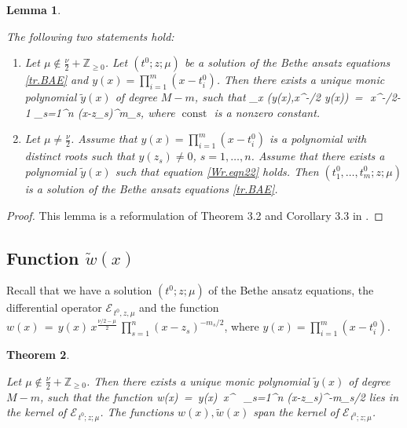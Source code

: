 \documentclass[12pt]{amsart}
\newtheorem{thm}{Theorem}[section]
\newtheorem{lem}[thm]{Lemma}
\numberwithin{equation}{section}
\theoremstyle{definition}
\let\mc\mathcal
\let\geq\geqslant
\let\on\operatorname
\def\Z{{\mathbb Z}}
\def\const{\on{const}}
\def\Wr{\on{Wr}}
\begin{document}
\begin{lem} 
\label{lem WBA}

The following two statements hold:

\begin{enumerate}

\item[(i)]

Let $\mu\notin \frac\nu2+\Z_{\geq 0}$. Let   $(t^0;z;\mu)$ be a solution
 of the Bethe ansatz equations \eqref{tr.BAE} and
$y(x)=  \prod_{i=1}^m(x-t^0_i)$.  Then there exists a unique 
monic polynomial $\tilde y(x)$ of degree $M-m$, such that 
\bean
\label{Wr.eqn22}
\Wr_x (y(x),x^{\mu-\nu/2} \tilde y(x)) \,=\,\const\, x^{\mu-\nu/2-1} \prod_{s=1}^n (x-z_s)^{m_s},
\eean
where $\const$ is a nonzero constant.


\item[(ii)]

Let  $\mu\ne \frac\nu2$. Assume that $y(x)=  \prod_{i=1}^m(x-t^0_i)$ is a polynomial
with distinct roots
 such that   $y(z_s)\ne 0$,  $s=1,\dots,n$. Assume that
 there exists a polynomial $\tilde y(x)$ such that
 equation \eqref{Wr.eqn22} holds. Then $(t^0_1,\dots,t^0_m;z;\mu)$ is a solution of the Bethe ansatz equations \eqref{tr.BAE}.
\end{enumerate}

\end{lem}

\begin{proof}
This lemma is a reformulation of Theorem 3.2 and Corollary 3.3 in \cite{MV2}.
\end{proof}

\subsection{Function $\tilde w(x)$} \label{ssec utild}


Recall that we have  a solution $(t^0; z; \mu)$ of the Bethe ansatz equations, the differential
operator $\mc E_{\,t^0\!,z,\mu}$  and the function
$w(x) \,=\,y(x)\, x^{\frac{\nu/2-\mu}{2}} \,\prod_{s=1}^n (x-z_s)^{-m_s/2}$, where
$y(x) =\prod_{i=1}^m (x- t^0_i)$.


\begin{thm}
\label{quasipthm}


Let $\mu\notin \frac\nu2+\Z_{\geq 0}$. Then there exists a unique 
monic polynomial $\tilde y(x)$ of degree $M-m$, such that the function
\bean
\label{utild}
\tilde w(x) \,= \,\tilde y(x)\, x^{ }\, \prod_{s=1}^n (x-z_s)^{-m_s/2}
\eean 
lies in the kernel of $\mc E_{\,t^0; z;\mu}$. The functions $w(x), \tilde w(x)$ span the kernel of
 $\mc E_{\,t^0 ; z; \mu}$.

\end{thm}
\end{document}
